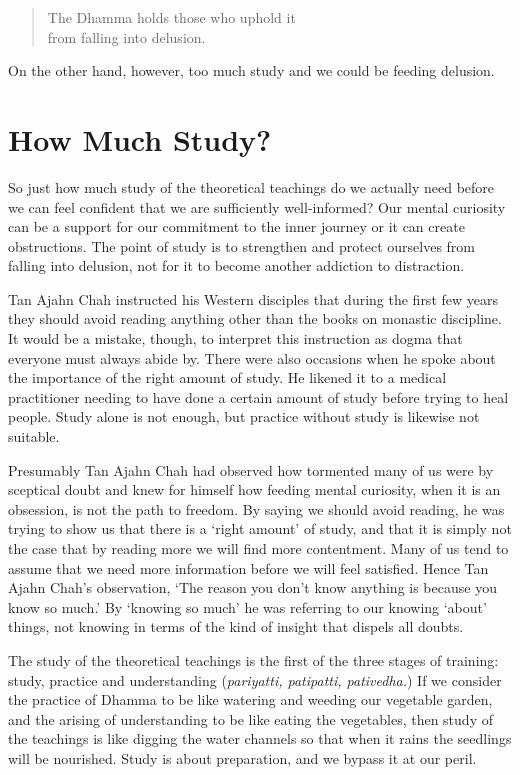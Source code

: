 \begin{quote}
  The Dhamma holds those who uphold it\\
  from falling into delusion.
\end{quote}

On the other hand, however, too much study and we could be feeding
delusion.

\section{How Much Study?}

So just how much study of the theoretical teachings do we actually need
before we can feel confident that we are sufficiently well-informed? Our
mental curiosity can be a support for our commitment to the inner
journey or it can create obstructions. The point of study is to
strengthen and protect ourselves from falling into delusion, not for it
to become another addiction to distraction.

Tan Ajahn Chah instructed his Western disciples that during the first
few years they should avoid reading anything other than the books on
monastic discipline. It would be a mistake, though, to interpret this
instruction as dogma that everyone must always abide by. There were also
occasions when he spoke about the importance of the right amount of
study. He likened it to a medical practitioner needing to have done a
certain amount of study before trying to heal people. Study alone is not
enough, but practice without study is likewise not suitable.

Presumably Tan Ajahn Chah had observed how tormented many of us were by
sceptical doubt and knew for himself how feeding mental curiosity, when
it is an obsession, is not the path to freedom. By saying we should
avoid reading, he was trying to show us that there is a `right amount'
of study, and that it is simply not the case that by reading more we
will find more contentment. Many of us tend to assume that we need more
information before we will feel satisfied. Hence Tan Ajahn Chah's
observation, `The reason you don't know anything is because you know so
much.' By `knowing so much' he was referring to our knowing `about'
things, not knowing in terms of the kind of insight that dispels all
doubts.

The study of the theoretical teachings is the first of the three stages
of training: study, practice and understanding (\emph{pariyatti,
patipatti, pativedha.}) If we consider the practice of Dhamma to be like
watering and weeding our vegetable garden, and the arising of
understanding to be like eating the vegetables, then study of the
teachings is like digging the water channels so that when it rains the
seedlings will be nourished. Study is about preparation, and we bypass
it at our peril.

